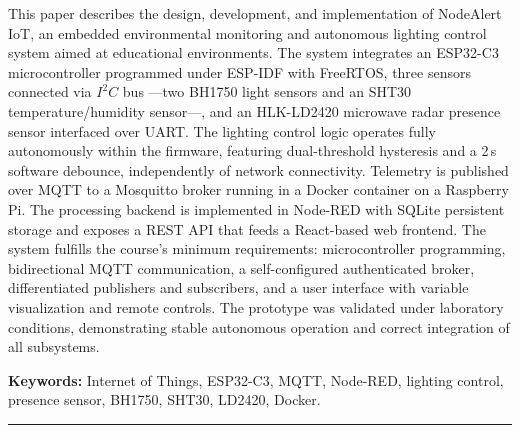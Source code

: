 \noindent
This paper describes the design, development, and implementation of NodeAlert IoT,
an embedded environmental monitoring and autonomous lighting control system aimed
at educational environments. The system integrates an ESP32-C3 microcontroller
programmed under ESP-IDF with FreeRTOS, three sensors connected via \(I^2C\) bus
—two BH1750 light sensors and an SHT30 temperature/humidity sensor—, and an
HLK-LD2420 microwave radar presence sensor interfaced over UART. The lighting
control logic operates fully autonomously within the firmware, featuring dual-threshold
hysteresis and a 2\,s software debounce, independently of network connectivity.
Telemetry is published over MQTT to a Mosquitto broker running in a Docker container
on a Raspberry Pi. The processing backend is implemented in Node-RED with SQLite
persistent storage and exposes a REST API that feeds a React-based web frontend.
The system fulfills the course's minimum requirements: microcontroller programming,
bidirectional MQTT communication, a self-configured
authenticated broker, differentiated publishers and subscribers, and a user interface
with variable visualization and remote controls. The prototype was validated under
laboratory conditions, demonstrating stable autonomous operation and correct
integration of all subsystems.

\vspace{10pt}
\noindent\textbf{Keywords:} Internet of Things, ESP32-C3, MQTT, Node-RED,
lighting control, presence sensor, BH1750, SHT30, LD2420, Docker.

\vspace{10pt}
\hrule


